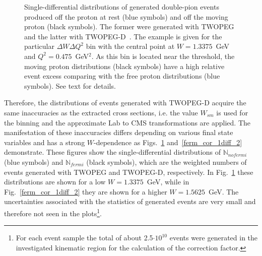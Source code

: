 \begin{figure}[htp]
\begin{center}
\caption{\small Single-differential distributions of generated double-pion events produced off the proton at rest (blue symbols) and off the moving proton (black symbols). The former were generated with TWOPEG~\cite{twopeg} and the latter with TWOPEG-D~\cite{twopeg-d}. The example is given for the particular $\Delta W \Delta Q^{2}$ bin with the central point at $W=1.3375$~GeV and $Q^{2}=0.475$~GeV$^{2}$. As this bin is located near the threshold, the moving proton distributions (black symbols) have a high relative event excess comparing with the free proton distributions (blue symbols). See text for details. } \label{ferm_cor_1diff_1}
\end{center}
\end{figure}

Therefore, the distributions of events generated with TWOPEG-D acquire the same inaccuracies as the extracted cross sections, i.e. the value $W_{sm}$ is used for the binning and the approximate Lab to CMS transformations are applied. The manifestation of these inaccuracies differs depending on various final state variables and has a strong $W$-dependence as Figs.~\ref{ferm_cor_1diff_1} and~\ref{ferm_cor_1diff_2} demonstrate. These figures show the single-differential distributions of $\mathbb{N}_{nofermi}$ (blue symbols) and $\mathbb{N}_{fermi}$ (black symbols), which are the weighted numbers of events generated with TWOPEG and TWOPEG-D, respectively. In Fig.~\ref{ferm_cor_1diff_1} these distributions are shown for a low $W = 1.3375$~GeV, while in Fig.~\ref{ferm_cor_1diff_2} they are shown for a higher $W=1.5625$~GeV. The uncertainties associated with the statistics of generated events are very small and therefore not seen in the plots\footnote[4]{For each event sample the total of about 2.5$\cdot 10^{10}$ events were generated in the investigated kinematic region for the calculation of the correction factor.}.

